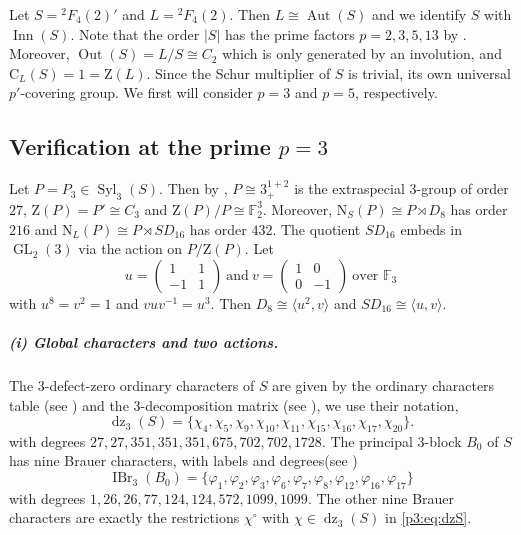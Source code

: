 \documentclass[11pt,a4paper]{article}
\numberwithin{equation}{section}
\theoremstyle{definition}
\theoremstyle{remark}
\newcommand{\IBr}{\operatorname{IBr}}
\newcommand{\Aut}{\operatorname{Aut}}
\newcommand{\Out}{\operatorname{Out}}
\newcommand{\GL}{\operatorname{GL}}
\DeclareMathOperator{\Inn}{Inn}
\newcommand{\Syl}{\operatorname{Syl}}
\newcommand{\dz}{\operatorname{dz}}
\newcommand{\ZZ}{\mathrm{Z}}
\newcommand{\FF}{\mathbb F}
\newcommand{\NN}{\mathrm N}
\newcommand{\CC}{\mathrm C}
\begin{document}
Let \(S={}^2F_4(2)'\) and \(L={}^2F_4(2)\). Then $L\cong \Aut(S)$ and we identify \(S\) with \(\Inn(S)\). Note that the order $|S|$ has the prime factors $p=2,3,5,13$ by \cite{T}. Moreover,  $\Out(S)=L/S\cong C_2$ which is only generated by an involution, and  $\CC_L(S)=1=\ZZ(L)$.
Since the Schur multiplier of $S$ is trivial, its own universal \(p'\)-covering group. We first will consider $p=3$ and $p=5$, respectively.

\subsection{Verification at the prime 
\texorpdfstring{$p=3$}{p=3}}\label{sec:p3}
Let $P=P_3\in\Syl_3(S)$. Then by \cite{T}, $P\cong3_{+}^{1+2}$ is the  extraspecial $3$-group of order $27$, $\ZZ(P) = P'\cong  C_3$ and $\ZZ(P)/P\cong {\mathbb F}_2^3$. Moreover,  $\NN_S(P)\cong P\rtimes D_8$ has order $216$ and $\NN_L(P)\cong P\rtimes SD_{16}$ has order $432$.  The quotient $SD_{16}$ embeds in $\GL_2(3)$ via the action on $P/\ZZ(P)$. Let
\begin{equation}\label{p3:eq:SDmat}
 u=\begin{pmatrix}1&1\\-1&1\end{pmatrix}\ \text{and}\
v=\begin{pmatrix}1&0\\0&-1\end{pmatrix}\ \text{over }\FF_3
\end{equation}
with \(u^8=v^2=1\) and \(vuv^{-1}=u^3\). 
Then \(D_8\cong\langle u^2,v\rangle\) and
\(SD_{16}\cong \langle u,v \rangle\).

\subparagraph{(i) Global characters and two actions.}
The 3-defect-zero ordinary characters of \(S\) are given by the ordinary characters table (see \cite{T}) and the \(3\)-decomposition matrix (see \cite[Block.1]{R}), we use their notation,
\begin{equation}\label{p3:eq:dzS}
 \dz_3(S)=\{\chi_4,\chi_5,\chi_9,\chi_{10},\chi_{11},
 \chi_{15},\chi_{16},\chi_{17},\chi_{20}\}.
\end{equation}
with degrees $27,27,351,351,351,675,702,702,1728$. 
The principal \(3\)-block $B_0$ of $S$ has nine Brauer characters, with labels and degrees(see \cite{R})
\begin{equation}\label{p3:eq:principal}
 \IBr_3(B_0)=\{\varphi_1,\varphi_2,\varphi_3,
 \varphi_6,\varphi_7,\varphi_8,\varphi_{12},
 \varphi_{16},\varphi_{17}\}
\end{equation}
with degrees $1,26,26,77,124,124,572,1099,1099$.
The other nine Brauer characters are exactly the restrictions \(\chi^\circ\) with \(\chi\in\dz_3(S)\) in \eqref{p3:eq:dzS}.   
\end{document}
